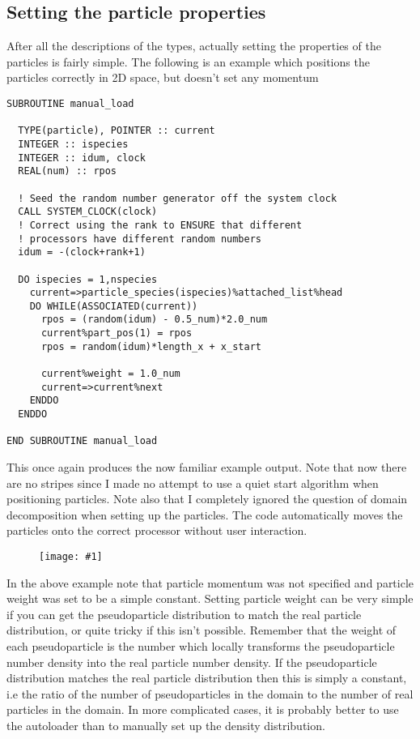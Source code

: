 \documentclass[12pt,a4paper]{article}
\newcommand{\simpleboxverbatim}{\begin{Verbatim}[obeytabs=true,frame=single,
  framerule=0.5mm,rulecolor=\color{warwickmid},formatcom=\color{black}]}
\newcommand{\image}[1]
  {{\begin{figure}\centering\texttt{[image: \#1]}\end{figure}}}
\begin{document}
\subsection{Setting the particle properties}
After all the descriptions of the types, actually setting the properties of
the particles is fairly simple. The following is an example which positions
the particles correctly in 2D space, but doesn't set any momentum

\simpleboxverbatim
SUBROUTINE manual_load

  TYPE(particle), POINTER :: current
  INTEGER :: ispecies
  INTEGER :: idum, clock
  REAL(num) :: rpos

  ! Seed the random number generator off the system clock
  CALL SYSTEM_CLOCK(clock)
  ! Correct using the rank to ENSURE that different
  ! processors have different random numbers
  idum = -(clock+rank+1)

  DO ispecies = 1,nspecies
    current=>particle_species(ispecies)%attached_list%head
    DO WHILE(ASSOCIATED(current))
      rpos = (random(idum) - 0.5_num)*2.0_num
      current%part_pos(1) = rpos
      rpos = random(idum)*length_x + x_start

      current%weight = 1.0_num
      current=>current%next
    ENDDO
  ENDDO

END SUBROUTINE manual_load
\end{Verbatim}

This once again produces the now familiar example output. Note that now there
are no stripes since I made no attempt to use a quiet start algorithm when
positioning particles. Note also that I completely ignored the question of
domain decomposition when setting up the particles. The code automatically
moves the particles onto the correct processor without user interaction.
\image{./images/example4}
In the above example note that particle momentum was not specified and
particle weight was set to be a simple constant. Setting particle weight can
be very simple if you can get the pseudoparticle distribution to match the
real particle distribution, or quite tricky if this isn't possible. Remember
that the weight of each pseudoparticle is the number which locally transforms
the pseudoparticle number density into the real particle number density. If
the pseudoparticle distribution matches the real particle distribution then
this is simply a constant, i.e the ratio of the number of pseudoparticles in
the domain to the number of real particles in the domain. In more complicated
cases, it is probably better to use the autoloader than to manually set up the
density distribution.
\end{document}
